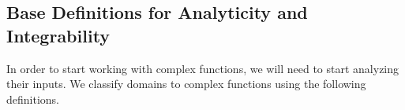 \subsection*{Base Definitions for Analyticity and Integrability}
In order to start working with complex functions, we will need to start analyzing their inputs.
We classify domains to complex functions using the following definitions.
\begin{quote}
    
    
    
    
    
    
\end{quote}
